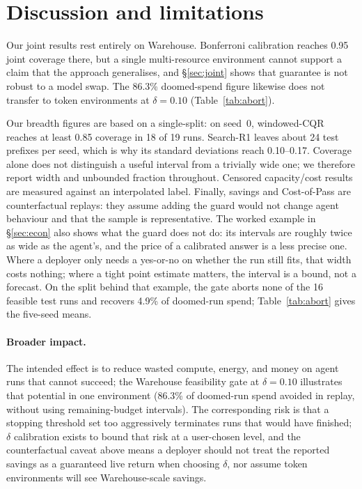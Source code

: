 \documentclass{article}
\begin{document}
\flushbottom
\section{Discussion and limitations}
\label{sec:discussion}

Our joint results rest entirely on Warehouse. Bonferroni calibration reaches 0.95 joint coverage there, but a single multi-resource environment cannot support a claim that the approach generalises, and \S\ref{sec:joint} shows that guarantee is not robust to a model swap. The 86.3\% doomed-spend figure likewise does not transfer to token environments at $\delta{=}0.10$ (Table~\ref{tab:abort}).

Our breadth figures are based on a single-split: on seed~0, windowed-CQR reaches at least 0.85 coverage in 18 of 19 runs. Search-R1 leaves about 24 test prefixes per seed, which is why its standard deviations reach 0.10--0.17. Coverage alone does not distinguish a useful interval from a trivially wide one; we therefore report width and unbounded fraction throughout. Censored capacity/cost results are measured against an interpolated label. Finally, savings and Cost-of-Pass are counterfactual replays: they assume adding the guard would not change agent behaviour and that the sample is representative. The worked example in \S\ref{sec:econ} also shows what the guard does not do: its intervals are roughly twice as wide as the agent's, and the price of a calibrated answer is a less precise one. Where a deployer only needs a yes-or-no on whether the run still fits, that width costs nothing; where a tight point estimate matters, the interval is a bound, not a forecast. On the split behind that example, the gate aborts none of the 16 feasible test runs and recovers 4.9\% of doomed-run spend; Table~\ref{tab:abort} gives the five-seed means.

\paragraph{Broader impact.}
The intended effect is to reduce wasted compute, energy, and money on agent runs that cannot succeed; the Warehouse feasibility gate at $\delta{=}0.10$ illustrates that potential in one environment (86.3\% of doomed-run spend avoided in replay, without using remaining-budget intervals). The corresponding risk is that a stopping threshold set too aggressively terminates runs that would have finished; $\delta$ calibration exists to bound that risk at a user-chosen level, and the counterfactual caveat above means a deployer should not treat the reported savings as a guaranteed live return when choosing $\delta$, nor assume token environments will see Warehouse-scale savings.
\end{document}

